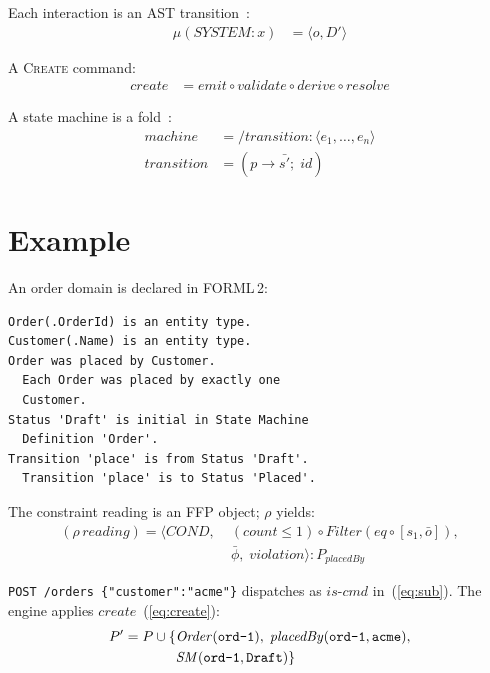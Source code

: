 \documentclass[acmsmall,screen,review]{acmart}
\begin{document}
Each interaction is an AST transition~\cite[Sec.\,14.3.1]{backus78}:
\begin{align}
\mu(\mathit{SYSTEM}\!:\!x) &= \langle o, D' \rangle \label{eq:transition}
\end{align}

A \textsc{Create} command:
\begin{align}
\mathit{create} &= \mathit{emit} \circ \mathit{validate} \circ \mathit{derive} \circ \mathit{resolve} \label{eq:create}
\end{align}

A state machine is a fold~\cite[Sec.\,11.2.4]{backus78}:
\begin{align}
\mathit{machine} &= /\mathit{transition} : \langle e_1, \ldots, e_n \rangle \label{eq:sm} \\
\mathit{transition} &= (p \to \bar{s'} ;\; \mathit{id}) \label{eq:trans}
\end{align}

\section{Example}

An order domain is declared in FORML\,2:

\begin{lstlisting}
Order(.OrderId) is an entity type.
Customer(.Name) is an entity type.
Order was placed by Customer.
  Each Order was placed by exactly one
  Customer.
Status 'Draft' is initial in State Machine
  Definition 'Order'.
Transition 'place' is from Status 'Draft'.
  Transition 'place' is to Status 'Placed'.
\end{lstlisting}

The constraint reading is an FFP object; $\rho$ yields:
\begin{align*}
(\rho\,\mathit{reading}) = \langle\mathit{COND},\; &(\mathit{count} \leq 1) \circ \mathit{Filter}(\mathit{eq} \circ [s_1, \bar{o}]),\\
&\bar{\phi},\; \mathit{violation}\rangle : P_{\mathit{placedBy}}
\end{align*}

\texttt{POST /orders \{"customer":"acme"\}} dispatches as $\mathit{is\text{-}cmd}$ in~(\ref{eq:sub}). The engine applies $\mathit{create}$~(\ref{eq:create}):
\begin{align*}
P' = P \cup \{&\mathit{Order}(\texttt{ord\text{-}1}),\;
\mathit{placedBy}(\texttt{ord\text{-}1}, \texttt{acme}),\\
&\mathit{SM}(\texttt{ord\text{-}1}, \texttt{Draft})\}
\end{align*}
\end{document}
